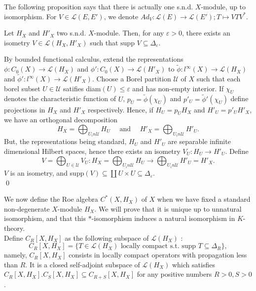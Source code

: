 The following proposition says that there is actually one s.n.d. $X$-module, up to isomorphism. For $V\in\mathcal L(E,E')$, we denote $Ad_V : \mathcal L(E) \rightarrow \mathcal L(E') ; T\mapsto VTV^*$.

\begin{prop}\label{SND}
Let $H_X$ and $H'_X$ two s.n.d. $X$-module. Then, for any $\varepsilon>0$, there exists an isometry $V\in\mathcal L(H_X,H'_X)$ such that $\text{supp }V \subseteq \Delta_\varepsilon$.
\end{prop}

\begin{dem}
By bounded functional calculus, extend the representations $\phi : C_0(X)\rightarrow \mathcal L(H_X)$ and $\phi' : C_0(X)\rightarrow \mathcal L(H'_X)$ to $\tilde \phi : l^\infty(X)\rightarrow \mathcal L(H_X) $ and $\tilde \phi' : l^\infty(X)\rightarrow \mathcal L(H'_X) $. Choose a Borel partition $\mathcal U$ of $X$ such that each borel subset $U\in\mathcal U$ satifies diam$(U)\leq \varepsilon $ and has non-empty interior. If $\chi_U$ denotes the characteristic function of $U$, $p_U = \tilde\phi(\chi_U)$ and $p'_{U}=\tilde\phi'(\chi_U)$ define projections in $H_X$ and $H'_X$ respectively. Hence, if $H_U = p_U H_X$ and $H'_U= p'_U H'_X$, we have an orthogonal decomposition 
\[H_X = \bigoplus_{U_in\mathcal U} H_U \quad  \text{ and } \quad H'_X = \bigoplus_{U_in\mathcal U} H'_U.\]
But, the representations being standard, $H_U$ and $H'_U$ are separable infinite dimensional Hilbert spaces, hence there exists an isometry $V_U : H_U\rightarrow H'_U$. Define 
\[V = \bigoplus_{U\in\mathcal U} V_U : H_X = \bigoplus_{U_in\mathcal U} H_U \rightarrow  \bigoplus_{U_in\mathcal U} H'_U = H'_X.  \]
$V$ is an isometry, and supp$(V)\subseteq \coprod U\times U \subseteq \Delta_\varepsilon$.\\
\qed
\end{dem}


We now define the Roe algebra $C^*(X, H_X)$ of $X$ when we have fixed a standard non-degenerate $X$-module $H_X$. We will prove that it is unique up to unnatural isomorphism, and that this $*$-isomorphism induces a natural isomorphism in $K$-theory.\\

Define $C_R[X,H_X]$ as the following subspace of $\mathcal L(H_X)$ :
\[C_R[X,H_X] = \{T\in \mathcal L(H_X) \text{ locally compact  s.t. supp }T\subseteq \Delta_R \},\]
namely, $C_R[X,H_X]$ consists in locally compact operators with propagation less than $R$. It is a closed self-adjoint subspace of $\mathcal L(H_X)$ which satisfies $C_R[X,H_X].C_S[X,H_X]\subseteq C_{R+S}[X,H_X]$ for any positive numbers $R>0,S>0$.\\

